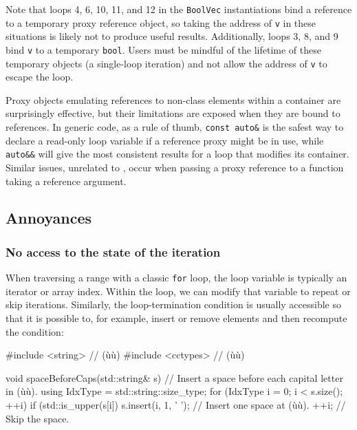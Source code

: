 {{{Note that loops 4, 6, 10, 11, and 12 in the \lstinline!BoolVec!
instantiations bind a reference to a temporary proxy reference object,
so taking the address of \lstinline!v! in these situations is likely not to
produce useful results. Additionally, loops 3, 8, and 9 bind \lstinline!v!
to a temporary \lstinline!bool!. Users must be mindful of the lifetime of
these temporary objects (a single-loop iteration) and not allow the
address of \lstinline!v! to escape the loop.

\noindent Proxy objects emulating references to non-class elements within a
container are surprisingly effective, but their limitations are exposed
when they are bound to references. In generic code, as a rule of thumb,
\lstinline!const!~\lstinline!auto&! is the safest way to declare a read-only
loop variable if a reference proxy might be in use, while
\lstinline!auto&&! will give the most consistent results for a loop that
modifies its container. Similar issues, unrelated to , occur when passing a proxy reference to a function
taking a reference argument.

\subsection[Annoyances]{Annoyances}\label{annoyances}

\subsubsection[No access to the state of the iteration]{No access to the state of the iteration}\label{no-access-to-the-state-of-the-iteration}

When traversing a range with a classic \lstinline!for! loop, the loop
variable is typically an iterator or array index. Within the loop, we
can modify that variable to repeat or skip iterations. Similarly, the
loop-termination condition is usually accessible so that it is possible
to, for example, insert or remove elements and then recompute the
condition:

\begin{emcppslisting}
#include <string>   // (ù{}ù)
#include <cctypes>  // (ù{}ù)

void spaceBeforeCaps(std::string& s)
{
    // Insert a space before each capital letter in (ù{}ù).
    using IdxType = std::string::size_type;
    for (IdxType i = 0; i < s.size(); ++i)
    {
        if (std::is_upper(s[i])
        {
            s.insert(i, 1, ' ');  // Insert one space at (ù{}ù).
            ++i;                  // Skip the space.
        }
    }
}
\end{emcppslisting}
    

}}}
